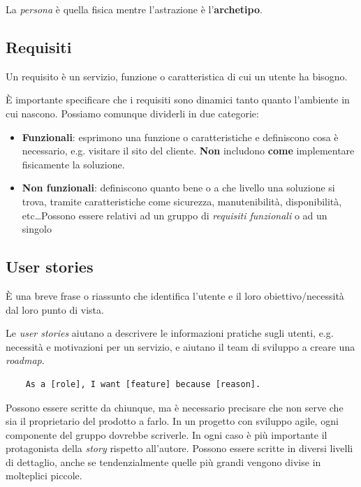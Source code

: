 \begin{note}[Archetype]
	La \textit{persona} è quella fisica mentre l'astrazione è l'\textbf{archetipo}.
\end{note}

\subsection{Requisiti}
\begin{definition}[Requisito]
	Un requisito è un servizio, funzione o caratteristica di cui un utente ha bisogno.
\end{definition}
È importante specificare che i requisiti sono dinamici tanto quanto l'ambiente in cui nascono. Possiamo comunque dividerli in due categorie:
\begin{itemize}
	\item \textbf{Funzionali}: esprimono una funzione o caratteristiche e definiscono cosa è necessario, e.g. visitare il sito del cliente. \textbf{Non} includono \textbf{come} implementare fisicamente la soluzione.
	\item \textbf{Non funzionali}: definiscono quanto bene o a che livello una soluzione si trova, tramite caratteristiche come sicurezza, manutenibilità, disponibilità, etc\dots Possono essere relativi ad un gruppo di \textit{requisiti funzionali} o ad un singolo
\end{itemize}

\subsection{User stories}
\begin{definition}
	È una breve frase o riassunto che identifica l'utente e il loro obiettivo/necessità dal loro punto di vista.
\end{definition}
Le \textit{user stories} aiutano a descrivere le informazioni pratiche sugli utenti, e.g. necessità e motivazioni per un servizio, e aiutano il team di sviluppo a creare una \textit{roadmap}.
\begin{lstlisting}
	As a [role], I want [feature] because [reason].
\end{lstlisting}
Possono essere scritte da chiunque, ma è necessario precisare che non serve che sia il proprietario del prodotto a farlo. In un progetto con sviluppo agile, ogni componente del gruppo dovrebbe scriverle. In ogni caso è più importante il protagonista della \textit{story} rispetto all'autore. Possono essere scritte in diversi livelli di dettaglio, anche se tendenzialmente quelle più grandi vengono divise in molteplici piccole.

